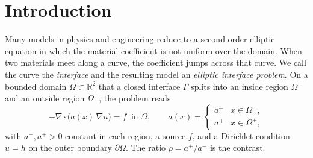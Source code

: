 \documentclass[preprint,12pt,authoryear]{elsarticle}
\begin{document}
\begin{frontmatter}

\begin{keyword}



\end{keyword}

\end{frontmatter}



\section{Introduction}
\label{sec:intro}

Many models in physics and engineering reduce to a second-order elliptic equation in which the material coefficient is not uniform over the domain. When two materials meet along a curve, the coefficient jumps across that curve. We call the curve the \emph{interface} and the resulting model an \emph{elliptic interface problem}. On a bounded domain $\Omega\subset\mathbb{R}^2$ that a closed interface $\Gamma$ splits into an inside region $\Omega^-$ and an outside region $\Omega^+$, the problem reads
\begin{equation}
-\nabla\!\cdot\!\big(a(x)\,\nabla u\big)=f \ \text{ in }\Omega,
\qquad
a(x)=\begin{cases} a^- & x\in\Omega^-,\\[2pt] a^+ & x\in\Omega^+,\end{cases}
\label{eq:intro-pde}
\end{equation}
with $a^-,a^+>0$ constant in each region, a source $f$, and a Dirichlet condition $u=h$ on the outer boundary $\partial\Omega$. The ratio $\rho=a^+/a^-$ is the contrast.
\end{document}
